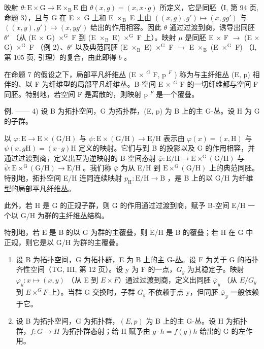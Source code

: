 映射 \(\theta\colon\mathrm{E}\times\mathrm{G}\to\mathrm{E}\times_{\mathrm{B}}\mathrm{E}\) 由 \(\theta(x,g)=(x,x\cdot g)\) 所定义，它是同胚（I, 第 94 页, 命题 3），且与 G 在 E \(\times\) G 上和 E \(\times_{\mathrm{B}}\) E 上由 \(((x,g),g')\mapsto(x,gg')\) 与 \(((x,y),g')\mapsto(x,yg')\) 给出的作用相容。因此 \(\theta\) 通过过渡到商，诱导出同胚 \(\theta'\) （从 (E \(\times\) G) \(\times^{\mathrm{G}}\) F 到 (E \(\times_{\mathrm{B}}\) E) \(\times^{\mathrm{G}}\) F 上）。映射 \(\mu\) 是同胚 E \(\times\) F \(\rightarrow\) (E \(\times\) G) \(\times^{\mathrm{G}}\) F （例 2）、\(\theta'\) 以及典范同胚 (E \(\times_{\mathrm{B}}\) E) \(\times^{\mathrm{G}}\) F \(\rightarrow\) E \(\times_{\mathrm{B}}\) (E \(\times^{\mathrm{G}}\) F) （I, 第 105 页, 引理）的复合，由此即得 \(b\) 。

在命题 7 的假设之下，局部平凡纤维丛 (E × \(^{G}\) F, p \(^{F}\) ) 称为与主纤维丛 (E, p) 相伴的、以 F 为纤维型的局部平凡纤维丛。B-空间 E × \(^{G}\) F 的一切纤维都与空间 F 同胚。特别地，若空间 F 是离散的，则映射 p \(^{F}\) 是一个覆叠。

例. —— 4) 设 B 为拓扑空间，G 为拓扑群，(E, p) 为 B 上的主 G-丛。设 H 为 G 的子群。

以 \(\varphi\colon\mathrm{E}\to\mathrm{E}\times(\mathrm{G}/\mathrm{H})\) 与 \(\psi\colon\mathrm{E}\times(\mathrm{G}/\mathrm{H})\to\mathrm{E}/\mathrm{H}\) 表示由 \(\varphi(x)=(x,\mathrm{H})\) 与 \(\psi(x,g\mathrm{H})=(x\cdot g)\mathrm{H}\) 定义的映射。它们与到 B 的投影以及 G 的作用相容，并通过过渡到商，定义出互为逆映射的 B-空间态射 \(\overline{\varphi}\colon\mathrm{E}/\mathrm{H}\to\mathrm{E}\times^{\mathrm{G}}(\mathrm{G}/\mathrm{H})\) 与 \(\overline{\psi}\colon\mathrm{E}\times^{\mathrm{G}}(\mathrm{G}/\mathrm{H})\to\mathrm{E}/\mathrm{H}\) 。我们称 \(\overline{\varphi}\) 为从 E/H 到 \(\mathrm{E}\times^{\mathrm{G}}(\mathrm{G}/\mathrm{H})\) 上的典范同胚。特别地，拓扑空间 E/H 连同连续映射 \(p_{\mathrm{H}}\colon\mathrm{E}/\mathrm{H}\to\mathrm{B}\) ，是 B 上的以 G/H 为纤维型的局部平凡纤维丛。

此外，若 H 是 G 的正规子群，则 G 的作用通过过渡到商，赋予 B-空间 E/H 一个以 G/H 为群的主纤维丛结构。

特别地，若 E 是 B 的以 G 为群的主覆叠，则 E/H 是 B 的覆叠；若 H 在 G 中正规，则它是以 G/H 为群的主覆叠。

\begin{enumerate}
\def\labelenumi{\arabic{enumi})}
\setcounter{enumi}{4}
\item
  设 B 为拓扑空间，G 为拓扑群，E 为 B 上的主 G-丛。设 F 为关于 G 的拓扑齐性空间（TG, III, 第 12 页）。设 y 为 F 的一点，\(G_{y}\) 为其稳定子。映射 \(\varphi_{y}\colon x\mapsto(x,y)\) （从 E 到 \(E\times F\)）通过过渡到商，定义出同胚 \(\overline{\varphi}_{y}\) （从 \(E/G_{y}\) 到 \(E\times^{G}F\) 上）。当群 G 交换时，子群 \(G_{y}\) 不依赖于点 y，但同胚 \(\overline{\varphi}_{y}\) 一般依赖于它。
\item
  设 B 为拓扑空间，G 为拓扑群，\((E,p)\) 为 B 上的主 G-丛。设 H 为拓扑群，\(f:G\to H\) 为拓扑群态射；给 H 赋予由 \(g\cdot h=f(g)h\) 给出的 G 的左作用。
\end{enumerate}

